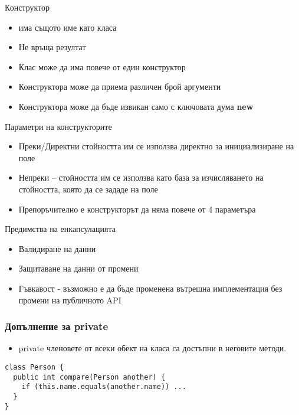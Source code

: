 \documentclass{beamer}
\begin{document}
\begin{frame}{Конструктор}
  \transdissolve
  \begin{itemize}
  \item има същото име като класа
  \item Не връща резултат
  \item Клас може да има повече от един
    конструктор
  \item Конструктора може да приема различен
    брой аргументи
  \item Конструктора може да бъде извикан
    само с ключовата дума \textbf{new}
  \end{itemize}
\end{frame}

\begin{frame}{Параметри на конструкторите}
  \transdissolve
  \begin{itemize}
  \item Преки/Директни 
    стойността им се
    използва директно за инициализиране
    на поле
  \item Непреки – 
    стойността им се
    използва като база за изчисляването на
    стойността, която да се зададе на поле
  \item Препоръчително е конструкторът да няма повече от 4 параметъра
  \end{itemize}
\end{frame}

\begin{frame}{Предимства на енкапсулацията}
  \transdissolve
  \begin{itemize}
  \item Валидиране на данни
  \item Защитаване на данни от промени
  \item Гъвкавост - възможно е да бъде
    променена вътрешна имплементация
    без промени на публичното API
  \end{itemize}
\end{frame}

\begin{frame}[fragile]
  \frametitle{Допълнение за private}
  \transdissolve
  \begin{itemize}
  \item private членовете от всеки обект на
    класа са достъпни в неговите методи.
  \end{itemize}
\begin{lstlisting}
class Person {
  public int compare(Person another) {
    if (this.name.equals(another.name)) ...
  }
}
\end{lstlisting}
\end{frame}
\end{document}

